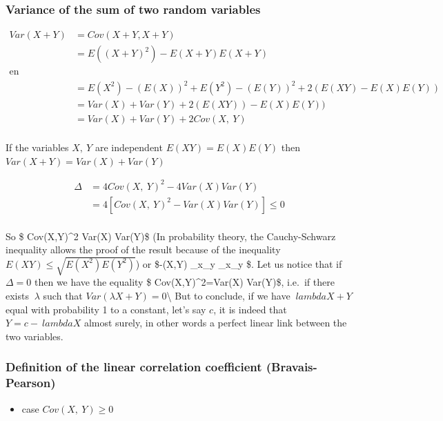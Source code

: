 \documentclass[
]{report}
\providecommand{\tightlist}{%
  \setlength{\itemsep}{0pt}\setlength{\parskip}{0pt}}
\begin{document}
\hypertarget{variance-of-the-sum-of-two-random-variables}{%
\subsubsection{Variance of the sum of two random variables}\label{variance-of-the-sum-of-two-random-variables}}

\begin{align*}
Var(X+Y) &= Cov(X+Y,X+Y)  \\
 &= E((X+Y)^2)-E(X+Y)E(X+Y)   \\
\text{en développant,}  \\
 &= E(X^2) - (E(X))^2 + E(Y^2) - (E(Y))^2 + 2(E(XY) - E(X)E(Y))  \\
 &= Var(X) + Var(Y) + 2(E(XY)) - E(X)E(Y))  \\
 &= Var(X) + Var(Y) + 2 Cov(X,~Y)  \\
\end{align*}

If the variables \(X,~Y\) are independent \(E(XY) = E(X)E(Y)\) then
\(Var(X+Y) = Var(X) + Var(Y)\)

\begin{align*}
\Delta &= 4Cov(X,~Y)^2-4Var(X)Var(Y)\\
&=4[Cov(X,~Y)^2-Var(X)Var(Y)] \leq 0\\
\end{align*}

So \$ Cov(X,Y)\^{}2 \leq Var(X) Var(Y)\$ (In probability theory, the Cauchy-Schwarz inequality allows the proof of the result because of the inequality \(E(XY)\leq \sqrt{E(X^2)E(Y^2)}\))
or \$-(X,Y) \leq \sigma\_x\sigma\_y \leq \sigma\_x\sigma\_y \$.
Let us notice that if \(\Delta=0\) then we have the equality \$ Cov(X,Y)\^{}2=Var(X) Var(Y)\$, i.e.~if there exists \(~\lambda\) such that \(Var(\lambda X+Y)=0\)\textbackslash{}
But to conclude, if we have \(~lambda X+Y\) equal with probability 1 to a constant, let's say \(c\), it is indeed that \(Y = c -~lambda X\) almost surely, in other words a perfect linear link between the two variables.

\hypertarget{definition-of-the-linear-correlation-coefficient-bravais-pearson}{%
\subsubsection{Definition of the linear correlation coefficient (Bravais-Pearson)}\label{definition-of-the-linear-correlation-coefficient-bravais-pearson}}

\begin{itemize}
\tightlist
\item
  case \(Cov(X,~Y)\geq 0\)
\end{itemize}
\end{document}
